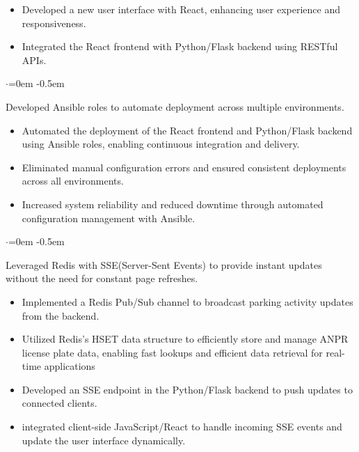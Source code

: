 \documentclass{article}
\begin{document}
\vspace{-1.6em}
\begin{itemize}
    \item Developed a new user interface with React, enhancing user experience and responsiveness.
    \item Integrated the React frontend with  Python/Flask backend using RESTful APIs.
\end{itemize}

\begin{list}{$\cdot$}{\leftmargin=0em} %
    \itemsep -0.5em \vspace{-0.5em} %
    \item Developed Ansible roles to automate deployment across multiple environments.
\end{list}

\vspace{-1.6em}
\begin{itemize}
    \item  Automated the deployment of the React frontend and Python/Flask backend using Ansible roles, enabling continuous integration and delivery.
    \item Eliminated manual configuration errors and ensured consistent deployments across all environments.  
    \item Increased system reliability and reduced downtime through automated configuration management with Ansible.
\end{itemize}



\begin{list}{$\cdot$}{\leftmargin=0em} %
    \itemsep -0.5em \vspace{-0.5em} %
    \item  Leveraged Redis with SSE(Server-Sent Events) to provide instant updates without the need for constant
    page refreshes.
\end{list}

\vspace{-1.6em}
\begin{itemize}
    \item Implemented a Redis Pub/Sub channel to broadcast parking activity updates from the backend.
    \item Utilized Redis's HSET data structure to efficiently store and manage ANPR license plate data, enabling fast lookups and efficient data retrieval for real-time applications
    \item Developed an SSE endpoint in the Python/Flask backend to push updates to connected clients.
    \item integrated client-side JavaScript/React  to handle incoming SSE events and update the user interface dynamically.
\end{itemize}
\end{document}
